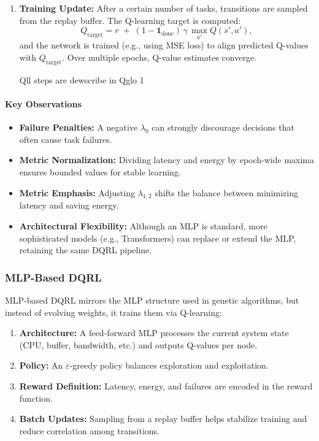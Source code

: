 \begin{enumerate}
    \item \textbf{Training Update:}
    After a certain number of tasks, transitions are sampled from the replay buffer. The Q-learning target is computed:
    \[
      Q_{\text{target}} = r \;+\; (1 - \mathbf{1}_{\text{done}})\,\gamma\, \max_{a'} Q(s',a'),
    \]
    and the network is trained (e.g., using MSE loss) to align predicted Q-values with \(Q_{\text{target}}\). Over multiple epochs, Q-value estimates converge.

Qll steps are dewscribe in Qglo 1

\end{enumerate}

\paragraph{Key Observations}
\begin{itemize}
    \item \textbf{Failure Penalties:} A negative \(\lambda_{0}\) can strongly discourage decisions that often cause task failures.
    \item \textbf{Metric Normalization:} Dividing latency and energy by epoch-wide maxima ensures bounded values for stable learning.
    \item \textbf{Metric Emphasis:} Adjusting \(\lambda_{1,2}\) shifts the balance between minimizing latency and saving energy.
    \item \textbf{Architectural Flexibility:} Although an MLP is standard, more sophisticated models (e.g., Transformers) can replace or extend the MLP, retaining the same DQRL pipeline.
\end{itemize}

\subsubsection{MLP-Based DQRL}
\label{subsubsec:mlp_dqrl}
MLP-based DQRL mirrors the MLP structure used in genetic algorithms, but instead of evolving weights, it trains them via Q-learning:
\begin{enumerate}
    \item \textbf{Architecture:} A feed-forward MLP processes the current system state (CPU, buffer, bandwidth, etc.) and outputs Q-values per node.
    \item \textbf{Policy:} An \(\varepsilon\)-greedy policy balances exploration and exploitation.
    \item \textbf{Reward Definition:} Latency, energy, and failures are encoded in the reward function.
    \item \textbf{Batch Updates:} Sampling from a replay buffer helps stabilize training and reduce correlation among transitions.
\end{enumerate}






